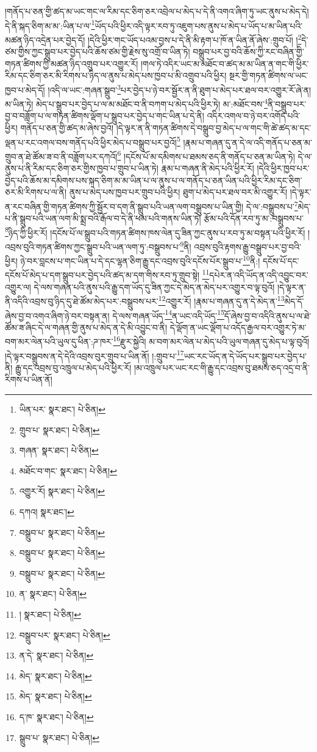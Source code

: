 །གནོད་པ་ཅན་གྱི་ཚད་མ་ཡང་གང་ལ་རིམ་དང་ཅིག་ཅར་འབྲེལ་པ་མེད་པ་དེ་ནི་འགའ་ཞིག་ཏུ་ཡང་ནུས་པ་མེད་དེ། དེ་ནི་སྐད་ཅིག་མ་མ་:ཡིན་པ་ལ་\footnote{ཡིན་པར་  སྣར་ཐང་།  པེ་ཅིན། }ཡོད་པའི་ཕྱིར་འདི་ལྟར་རབ་ཏུ་འཇུག་པས་ནུས་པ་མེད་པ་ཡོད་པ་མ་ཡིན་པའི་མཚན་ཉིད་འདྲེན་པར་བྱེད་དོ། །དེའི་ཕྱིར་གང་ཡོད་པའམ་བྱས་པ་དེ་ནི་མི་རྟག་པ་ཁོ་ན་ཡིན་ནོ་ཞེས་:གྲུབ་པོ། །\footnote{གྲུབ་པ་  སྣར་ཐང་།  པེ་ཅིན། }དེ་ཙམ་གྱིས་ཀྱང་སྒྲུབ་པར་བྱེད་པའི་ཆོས་ཙམ་གྱི་རྗེས་སུ་འགྲོ་བ་ཡིན་ཏེ། བསྒྲུབ་པར་བྱ་བའི་ཆོས་ཀྱི་རང་བཞིན་གྱི་གཏན་ཚིགས་ཀྱི་མཚན་ཉིད་འགྲུབ་པར་འགྱུར་རོ། །གལ་ཏེ་འདིར་ཡང་མ་མཐོང་བ་ཚད་མ་མ་ཡིན་ན་གང་གི་ཕྱིར་རིམ་དང་ཅིག་ཅར་མི་རིགས་པ་ཉིད་ལ་ནུས་པ་མེད་པས་ཁྱབ་པ་མི་འགྲུབ་པའི་ཕྱིར། སྔར་གྱི་གཏན་ཚིགས་ལ་ཡང་ཁྱབ་པ་མེད་དོ། །འདི་ལ་ཡང་:གཞན་སྒྲུབ་\footnote{གཞན་  སྣར་ཐང་།  པེ་ཅིན། }པར་བྱེད་པ་ཉེ་བར་སྦྱོར་ན་ནི་ཐུག་པ་མེད་པར་ཐལ་བར་འགྱུར་རོ་ཞེ་ན། མ་ཡིན་ཏེ། མེད་པ་སྒྲུབ་པར་བྱེད་པ་ལ་མ་མཐོང་བ་ནི་བཀག་པ་མེད་པའི་ཕྱིར་ཏེ། མ་:མཐོང་བས་\footnote{མཐོང་བ་གང་  སྣར་ཐང་།  པེ་ཅིན། }ནི་བསྒྲུབ་པར་བྱ་བ་བཟློག་པ་ལ་གཏན་ཚིགས་ལྡོག་པ་སྒྲུབ་པར་བྱེད་པ་གང་ཡིན་པ་དེ་ནི། འདིར་འགལ་བ་ཉེ་བར་འགོད་པའི་ཕྱིར། གནོད་པ་ཅན་གྱི་ཚད་མ་ཞེས་བྱའོ། །དེ་ལྟར་ན་ནི་གཏན་ཚིགས་དེ་བསྒྲུབ་བྱ་མེད་པ་ལ་གང་གི་ཚེ་ཚད་མ་དང་ལྡན་པ་རང་འགལ་བས་གནོད་པའི་ཕྱིར་མེད་པ་བསྒྲུབ་པར་བྱའོ།\footnote{འགྱུར་རོ།  སྣར་ཐང་།  པེ་ཅིན། } །རྣམ་པ་གཞན་དུ་ན་དེ་ལ་འདི་གནོད་པ་ཅན་མ་གྲུབ་ན་ཐེ་ཚོམ་ཟ་བ་ནི་བཟློག་པར་དཀའོ།\footnote{དཀའ།  སྣར་ཐང་། } །དངོས་པོ་མ་དམིགས་པ་ཐམས་ཅད་ནི་གནོད་པ་ཅན་མ་ཡིན་ཏེ། དེ་ལ་ནུས་པ་ནི་རིམ་དང་ཅིག་ཅར་གྱིས་ཁྱབ་པ་གྲུབ་པ་ཡིན་ཏེ། རྣམ་པ་གཞན་ནི་མེད་པའི་ཕྱིར་རོ། །དེའི་ཕྱིར་ཁྱབ་པར་བྱེད་པའི་ཆོས་མ་དམིགས་པས་སྐད་ཅིག་མ་མ་ཡིན་པ་ལ་ནུས་པ་ལ་གནོད་པ་ཅན་ཡིན་པའི་ཕྱིར་རིམ་དང་ཅིག་ཅར་མི་རིགས་པ་ལ་ནི། ནུས་པ་མེད་པས་ཁྱབ་པར་གྲུབ་པའི་ཕྱིར། ཐུག་པ་མེད་པར་ཐལ་བར་མི་འགྱུར་རོ། །དེ་ལྟར་ན་རང་བཞིན་གྱི་གཏན་ཚིགས་ཀྱི་སྦྱོར་བ་དག་ནི་སྒྲུབ་པའི་ཡན་ལག་བསྒྲུབས་པ་ཡིན་གྱི། དེ་ལ་:བསྒྲུབས་པ་\footnote{བསྒྲུབ་པ་  སྣར་ཐང་།  པེ་ཅིན། }མེད་པ་ནི་སྒྲུབ་པའི་ཡན་ལག་མི་སྨྲ་བའི་རྒོལ་བ་དེ་ནི་ཕམ་པའི་གནས་ཡིན་ཏེ། རྩོམ་པའི་དོན་རབ་ཏུ་མ་:བསྒྲུབས་པ་\footnote{བསྒྲུབ་པ་  སྣར་ཐང་།  པེ་ཅིན། }ཉིད་ཀྱི་ཕྱིར་རོ། །དངོས་པོ་ལ་སྒྲུབ་པའི་གཏན་ཚིགས་ཁས་ལེན་དུ་ཟིན་ཀྱང་ནུས་པ་རབ་ཏུ་མ་བསྟན་པའི་ཕྱིར་རོ། །འབྲས་བུའི་གཏན་ཚིགས་ཀྱང་སྒྲུབ་པའི་ཡན་ལག་ཏུ་:བསྒྲུབས་པ་\footnote{བསྒྲུབ་པ་  སྣར་ཐང་།  པེ་ཅིན། }ནི། འབྲས་བུའི་རྟགས་རྒྱུ་བསྒྲུབ་པར་བྱ་བའི་ཕྱིར། ཉེ་བར་བླངས་པ་གང་ཡིན་པ་དེ་དང་ལྷན་ཅིག་རྒྱུ་དང་འབྲས་བུའི་དངོས་པོར་སྒྲུབ་པ་\footnote{ན་  སྣར་ཐང་།  པེ་ཅིན། }ནི:། དངོས་པོ་དང་དངོས་པོ་མེད་པ་དག་སྒྲུབ་པར་བྱེད་པའི་ཚད་མ་དག་གིས་རབ་ཏུ་གྲུབ་སྟེ། \footnote{།    སྣར་ཐང་།  པེ་ཅིན། }དཔེར་ན་འདི་ཡོད་ན་འདི་འབྱུང་བར་འགྱུར་ལ། དེ་ལས་གཞན་པའི་ནུས་པའི་རྒྱུ་དག་ཡོད་དུ་ཟིན་ཀྱང་དེ་མེད་ན་མེད་པར་འགྱུར་བ་ལྟ་བུའོ། །དེ་ལྟར་ན་ནི་འདིའི་འབྲས་བུ་ཉིད་དུ་ཐེ་ཚོམ་མེད་པར་:བསྒྲུབས་པར་\footnote{བསྒྲུབ་པར་  སྣར་ཐང་།  པེ་ཅིན། }འགྱུར་རོ། །རྣམ་པ་གཞན་དུ་ན་དེ་མེད་ན་\footnote{ན་དེ་  སྣར་ཐང་།  པེ་ཅིན། }མེད་དོ་ཞེས་བྱ་བ་འགའ་ཞིག་ཉེ་བར་བསྟན་ན། དེ་ལས་གཞན་ཡོད་\footnote{མེད་  སྣར་ཐང་།  པེ་ཅིན། }ན་ཡང་འདི་ཡོད་\footnote{མེད་  སྣར་ཐང་།  པེ་ཅིན། }དོ་ཞེས་བྱ་བ་འདིའི་ནུས་པ་ལ་ཐེ་ཚོམ་ཟ་ཞིང་དེ་ལ་གཞན་གྱི་ནུས་པ་མེད་ན་དེ་མི་འབྱུང་བ་ནི། དེ་ལྡོག་ན་ཡང་ལྡོག་པ་འདོད་རྒྱལ་བར་འགྱུར་ཏེ་མ་བག་མར་ལེན་པའི་ཡུལ་དུ་ཕིན་:ཌ་ཁར་\footnote{ད་ཁ་  སྣར་ཐང་།  པེ་ཅིན། }རྫུར་སྐྱེའི། མ་བག་མར་ལེན་པ་མེད་པའི་ཡུལ་གཞན་དུ་མེད་པ་ལྟ་བུའོ། །དེ་ལྟར་བསྒྲུབས་ན་དེ་དེའི་འབྲས་བུར་གྲུབ་པ་ཡིན་ནོ། །:གྲུབ་པ་\footnote{སྒྲུབ་པ་  སྣར་ཐང་།  པེ་ཅིན། }ཡང་རང་ཡོད་ན་དེ་ཡོད་པར་སྒྲུབ་པར་བྱེད་པ་ནི། རྒྱུ་དང་འབྲས་བུ་འཁྲུལ་པ་མེད་པའི་ཕྱིར་རོ། །མ་འཁྲུལ་པར་ཡང་རང་གི་རྒྱུ་དང་འབྲས་བུ་ཐམས་ཅད་འདྲ་བ་ནི་རིགས་པ་ཡིན་ནོ། 
